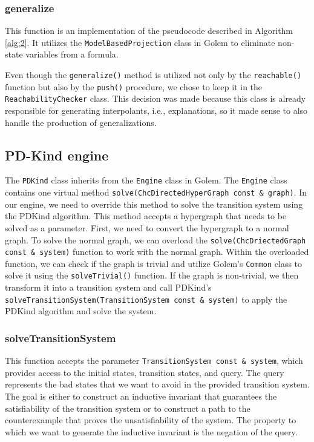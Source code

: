 \subsubsection{generalize}

\noindent This function is an implementation of the pseudocode described in Algorithm \ref{alg:2}. It utilizes the \texttt{ModelBasedProjection} class in Golem to eliminate non-state variables from a formula.

Even though the \texttt{generalize()} method is utilized not only by the \texttt{reachable()} function but also by the \texttt{push()} procedure, we chose to keep it in the \texttt{ReachabilityChecker} class. This decision was made because this class is already responsible for generating interpolants, i.e., explanations, so it made sense to also handle the production of generalizations.

\subsection{PD-Kind engine}
\noindent The \texttt{PDKind} class inherits from the \texttt{Engine} class in Golem. The \texttt{Engine} class contains one virtual method \texttt{solve(ChcDirectedHyperGraph const \& graph)}. In our engine, we need to override this method to solve the transition system using the PDKind algorithm. This method accepts a hypergraph that needs to be solved as a parameter. First, we need to convert the hypergraph to a normal graph. To solve the normal graph, we can overload the \texttt{solve(ChcDriectedGraph const \& system)} function to work with the normal graph. Within the overloaded function, we can check if the graph is trivial and utilize Golem's \texttt{Common} class to solve it using the \texttt{solveTrivial()} function. If the graph is non-trivial, we then transform it into a transition system and call PDKind's \texttt{solveTransitionSystem(TransitionSystem const \& system)} to apply the PDKind algorithm and solve the system.

\subsubsection{solveTransitionSystem}

\noindent This function accepts the parameter \texttt{TransitionSystem const \& system}, which provides access to the initial states, transition states, and query. The query represents the bad states that we want to avoid in the provided transition system. The goal is either to construct an inductive invariant that guarantees the satisfiability of the transition system or to construct a path to the counterexample that proves the unsatisfiability of the system. The property to which we want to generate the inductive invariant is the negation of the query.

